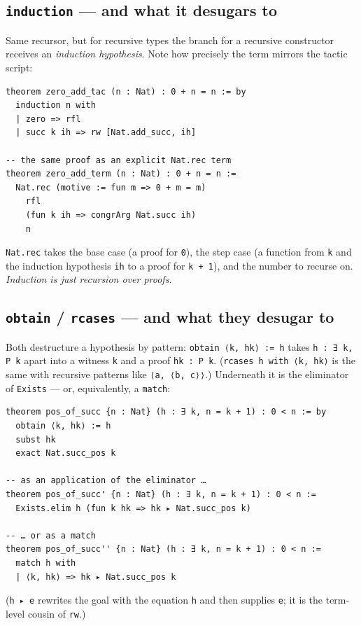 \documentclass[12pt, a4paper, openright]{book}
\theoremstyle{thmstyle}
\theoremstyle{defstyle}
\newcommand{\lc}[1]{\texttt{#1}}
\begin{document}
\subsection*{\lc{induction} --- and what it desugars to}

Same recursor, but for recursive types the branch for a recursive
constructor receives an \emph{induction hypothesis}. Note how precisely
the term mirrors the tactic script:

\begin{verbatim}
theorem zero_add_tac (n : Nat) : 0 + n = n := by
  induction n with
  | zero => rfl
  | succ k ih => rw [Nat.add_succ, ih]

-- the same proof as an explicit Nat.rec term
theorem zero_add_term (n : Nat) : 0 + n = n :=
  Nat.rec (motive := fun m => 0 + m = m)
    rfl
    (fun k ih => congrArg Nat.succ ih)
    n
\end{verbatim}

\lc{Nat.rec} takes the base case (a proof for \lc{0}), the step case (a
function from \lc{k} and the induction hypothesis \lc{ih} to a proof for
\lc{k + 1}), and the number to recurse on. \emph{Induction is just
recursion over proofs.}

\subsection*{\lc{obtain} / \lc{rcases} --- and what they desugar to}

Both destructure a hypothesis by pattern: \lc{obtain ⟨k, hk⟩ := h} takes
\lc{h : ∃ k, P k} apart into a witness \lc{k} and a proof \lc{hk : P k}.
(\lc{rcases h with ⟨k, hk⟩} is the same with recursive patterns like
\lc{⟨a, ⟨b, c⟩⟩}.) Underneath it is the eliminator of \lc{Exists} --- or,
equivalently, a \lc{match}:

\begin{verbatim}
theorem pos_of_succ {n : Nat} (h : ∃ k, n = k + 1) : 0 < n := by
  obtain ⟨k, hk⟩ := h
  subst hk
  exact Nat.succ_pos k

-- as an application of the eliminator …
theorem pos_of_succ' {n : Nat} (h : ∃ k, n = k + 1) : 0 < n :=
  Exists.elim h (fun k hk => hk ▸ Nat.succ_pos k)

-- … or as a match
theorem pos_of_succ'' {n : Nat} (h : ∃ k, n = k + 1) : 0 < n :=
  match h with
  | ⟨k, hk⟩ => hk ▸ Nat.succ_pos k
\end{verbatim}

(\lc{h ▸ e} rewrites the goal with the equation \lc{h} and then supplies
\lc{e}; it is the term-level cousin of \lc{rw}.)
\end{document}
